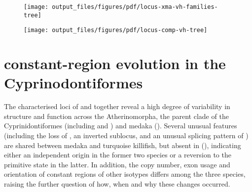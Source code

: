 	\begin{figure}
	\centering
	\texttt{[image: output\_files/figures/pdf/locus-xma-vh-families-tree]}
	\label{fig:xma-vh-families-tree}
	\end{figure}
	
	\begin{figure}
	\centering
	\texttt{[image: output\_files/figures/pdf/locus-comp-vh-tree]}
	\label{fig:nfu-xma-vh-tree-nt}
	\end{figure}
		
\FloatBarrier

\clearpage

\section{\igh{} constant-region evolution in the Cyprinodontiformes}
\label{sec:locus_comparative}

The characterised \igh{} loci of \nfu and \xma together reveal a high degree of variability in structure and function across the Atherinomorpha, the parent clade of the Cyprinidontiformes (including \Nfu and \Xma) and medaka (). Several unusual features (including the loss of , an inverted sublocus, and an unusual splicing pattern of ) are shared between medaka and turquoise killifish, but absent in \Xma (), indicating either an independent origin in the former two species or a reversion to the primitive state in the latter. In addition, the copy number, exon usage and orientation of constant regions of other isotypes differs among the three species, raising the further question of how, when and why these changes occurred. 

